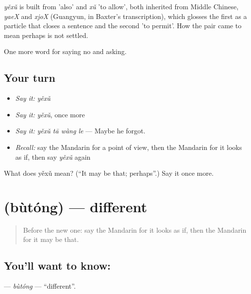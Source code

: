 \begin{cousinweb}
\emph{yěxǔ} is built from  'also' and \emph{xǔ} 'to allow', both inherited from Middle Chinese, \emph{yaeX} and \emph{xjoX} (Guangyun, in Baxter's transcription), which glosses the first as a particle that closes a sentence and the second 'to permit'. How the pair came to mean perhaps is not settled.
\end{cousinweb}

\begin{grammarlens}[title={What you've built}]
One more word for saying no and asking.
\end{grammarlens}

\subsection*{Your turn}
\begin{itemize}
\raggedright
  \item \emph{Say it:} \emph{yěxǔ}
  \item \emph{Say it:} \emph{yěxǔ}, once more
  \item \emph{Say it:} \emph{yěxǔ tā wàng le} — Maybe he forgot.
  \item \emph{Recall:} say the Mandarin for a point of view, then the Mandarin for it looks as if, then say \emph{yěxǔ} again
\end{itemize}

\begin{tcolorbox}[breakable,colback=teal!4,colframe=teal!35!black,title={Before you move on}]
What does yěxǔ mean? (\textquotedblleft{}It may be that; perhaps\textquotedblright{}.) Say it once more.
\end{tcolorbox}
\section[\texorpdfstring{\zh{不同} (bùtóng)}{不同 (bùtóng)}]{ (bùtóng) — different}

\label{lesson:ZH-C256-butong}



\begin{quote}
Before the new one: say the Mandarin for it looks as if, then the Mandarin for it may be that.
\end{quote}

\subsection*{You'll want to know: }
\textbf{} — \emph{bùtóng} — \textquotedblleft{}different\textquotedblright{}.

